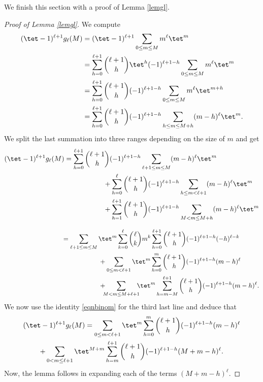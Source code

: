 We finish this section with a proof of Lemma \ref{lemgl}.

\begin{proof}[Proof of Lemma \ref{lemgl}]
We compute
\begin{equation*}
\begin{split}
(\tet-1)^{\ell+1}g_\ell(M)&= (\tet-1)^{\ell+1}\sum_{0\leq m\leq M} m^\ell \tet^m \\
&= \sum_{h=0}^{\ell+1}\binom{\ell+1}{h}\tet^h (-1)^{\ell+1-h}\sum_{0\leq m\leq M} m^\ell \tet^m\\
&= \sum_{h=0}^{\ell+1} \binom{\ell+1}{h} (-1)^{\ell+1-h}\sum_{0\leq m\leq M}m^\ell \tet^{m+h}\\
&= \sum_{h=0}^{\ell+1} \binom{\ell+1}{h} (-1)^{\ell+1-h} \sum_{h\leq m\leq M+h} (m-h)^\ell \tet^m.
\end{split}
\end{equation*}
We split the last summation into three ranges depending on the size of $m$ and get
\begin{align*}
(\tet-1)^{\ell+1}g_\ell(M)&= \sum_{h=0}^{\ell+1} \binom{\ell+1}{h} (-1)^{\ell+1-h} \sum_{\ell+1\leq m\leq M} (m-h)^\ell \tet^m\\
&\hspace*{2cm}+ \sum_{h=0}^{\ell} \binom{\ell+1}{h} (-1)^{\ell+1-h} \sum_{h\leq m < \ell+1} (m-h)^\ell \tet^m\\
&\hspace*{2cm}+\sum_{h=1}^{\ell+1} \binom{\ell+1}{h} (-1)^{\ell+1-h} \sum_{M < m\leq M+h} (m-h)^\ell \tet^m
\end{align*}
\par
\vspace*{-\baselineskip}
\begin{align*}
\hphantom{(\tet-1)^{\ell+1}g_\ell(M)}&= \sum_{\ell+1\leq m\leq M} \tet^m \sum_{k=0}^\ell \binom{\ell}{k} m^k \sum_{h=0}^{\ell+1} \binom{\ell+1}{h} (-1)^{\ell+1-h} (-h)^{\ell-k}\\
&\hspace*{2cm}+\sum_{0\leq m <\ell+1} \tet^m \sum_{h=0}^{m} \binom{\ell+1}{h} (-1)^{\ell+1-h}(m-h)^\ell \\
&\hspace*{2cm}+\hspace*{-2mm}\sum_{M<m\leq M+\ell+1}\hspace*{-2mm} \tet^m \sum_{h=m-M}^{\ell+1} \binom{\ell+1}{h} (-1)^{\ell+1-h} (m-h)^\ell.
\end{align*}
We now use the identity \eqref{eqnbinom} for the third last line and deduce that
\begin{multline*}
(\tet-1)^{\ell+1}g_\ell(M)=\sum_{0\leq m <\ell+1} \tet^m \sum_{h=0}^{m} \binom{\ell+1}{h} (-1)^{\ell+1-h}(m-h)^\ell \\
+\sum_{0<m\leq \ell+1} \tet^{M+m} \sum_{h=m}^{\ell+1} \binom{\ell+1}{h} (-1)^{\ell+1-h} (M+m-h)^\ell.
\end{multline*}
Now, the lemma follows in expanding each of the terms $(M+m-h)^\ell$.
\end{proof}

